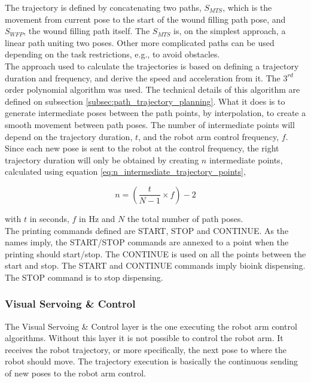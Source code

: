 The trajectory is defined by concatenating two paths, $S_{MTS}$, which is the movement from current pose to the start of the wound filling path pose, and $S_{WFP}$, the wound filling path itself. The $S_{MTS}$ is, on the simplest approach, a linear path uniting two poses. Other more complicated paths can be used depending on the task restrictions, e.g., to avoid obstacles.\\

The approach used to calculate the trajectories is based on defining a trajectory duration and frequency, and derive the speed and acceleration from it. The $3^{rd}$ order polynomial algorithm was used. The technical details of this algorithm are defined on subsection \ref{subsec:path_trajectory_planning}. What it does is to generate intermediate poses between the path points, by interpolation, to create a smooth movement between path poses. The number of intermediate points will depend on the trajectory duration, $t$, and the robot arm control frequency, $f$. Since each new pose is sent to the robot at the control frequency, the right trajectory duration will only be obtained by creating $n$ intermediate points, calculated using equation \ref{eq:n_intermediate_trajectory_points}, 

\begin{equation}
\label{eq:n_intermediate_trajectory_points}
    n = (\frac{t}{N-1} \times f) - 2
\end{equation}

with $t$ in seconds, $f$ in \si{\hertz} and $N$ the total number of path poses.\\

The printing commands defined are START, STOP and CONTINUE. As the names imply, the START/STOP commands are annexed to a point when the printing should start/stop. The CONTINUE is used on all the points between the start and stop. The START and CONTINUE commands imply bioink dispensing. The STOP command is to stop dispensing.


\subsubsection*{Visual Servoing \& Control}
\label{subsubsec:system_architectural_robot_layers_visual_servoing_control}

The Visual Servoing \& Control layer is the one executing the robot arm control algorithms. Without this layer it is not possible to control the robot arm. It receives the robot trajectory, or more specifically, the next pose to where the robot should move. The trajectory execution is basically the continuous sending of new poses to the robot arm control.

